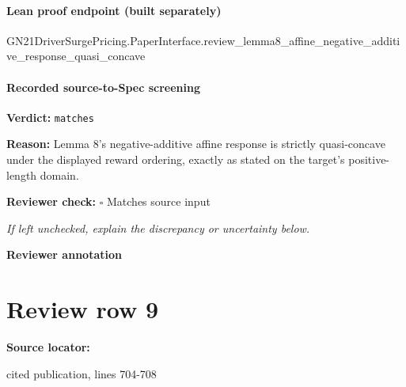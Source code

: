 \documentclass[10pt]{article}
\newcommand{\reviewerbox}{%
  \par\noindent\fbox{\parbox{0.96\linewidth}{\rule{0pt}{0.38in}}}\par
}
\newcommand{\reviewmatch}[1]{%
  \par\noindent\textbf{Reviewer check:} $\square$\; #1\par
  \noindent\emph{If left unchecked, explain the discrepancy or uncertainty below.}\par
}
\begin{document}
\paragraph{Lean proof endpoint (built separately)}\begin{ReviewVerbatim}
GN21DriverSurgePricing.PaperInterface.review_lemma8_affine_negative_additive_response_quasi_concave
\end{ReviewVerbatim}

\paragraph{Recorded source-to-Spec screening}
\textbf{Verdict:} \texttt{matches}
\\
{\raggedright
\textbf{Reason:} Lemma 8's negative-\allowbreak{}additive affine response is strictly quasi-\allowbreak{}concave under the displayed reward ordering, exactly as stated on the target's positive-\allowbreak{}length domain.\allowbreak{}
\par}
\reviewmatch{Matches source input}
\noindent\textbf{Reviewer annotation}\par
\reviewerbox
\clearpage
\hypertarget{source-claim-7d5af65772b5a76a}{}
\section*{Review row 9}
\textbf{Source locator:} {\footnotesize\raggedright cited publication, lines 704-\allowbreak{}708\par}
\end{document}
